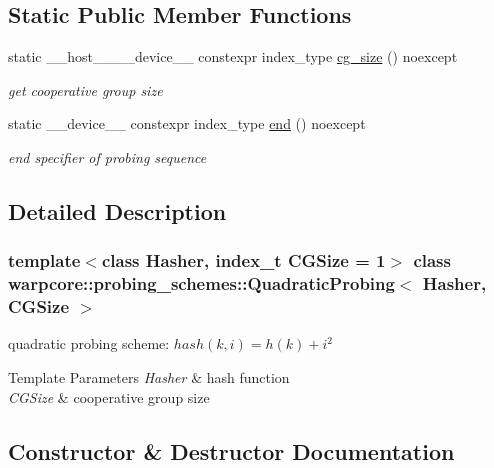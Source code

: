 \subsection*{Static Public Member Functions}
\begin{DoxyCompactItemize}
\item 
static \+\_\+\+\_\+host\+\_\+\+\_\+\+\_\+\+\_\+device\+\_\+\+\_\+ constexpr index\+\_\+type \hyperlink{classwarpcore_1_1probing__schemes_1_1QuadraticProbing_a20549e7a675cd8e4c422990267becbed}{cg\+\_\+size} () noexcept
\begin{DoxyCompactList}\small\item\em get cooperative group size \end{DoxyCompactList}\item 
static \+\_\+\+\_\+device\+\_\+\+\_\+ constexpr index\+\_\+type \hyperlink{classwarpcore_1_1probing__schemes_1_1QuadraticProbing_aa1eabb3eed4c1f2400fee8d7b487267e}{end} () noexcept
\begin{DoxyCompactList}\small\item\em end specifier of probing sequence \end{DoxyCompactList}\end{DoxyCompactItemize}


\subsection{Detailed Description}
\subsubsection*{template$<$class Hasher, index\+\_\+t C\+G\+Size = 1$>$\newline
class warpcore\+::probing\+\_\+schemes\+::\+Quadratic\+Probing$<$ Hasher, C\+G\+Size $>$}

quadratic probing scheme\+: $hash(k,i) = h(k)+i^2$ 


\begin{DoxyTemplParams}{Template Parameters}
{\em Hasher} & hash function \\
\hline
{\em C\+G\+Size} & cooperative group size \\
\hline
\end{DoxyTemplParams}


\subsection{Constructor \& Destructor Documentation}
\mbox{\label{classwarpcore_1_1probing__schemes_1_1QuadraticProbing_a90404a96e73f9914e7ea9b80b15895fa}} 
